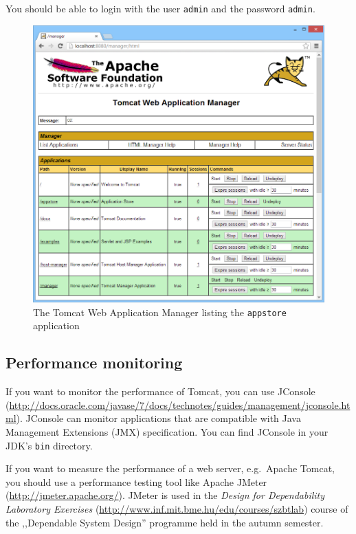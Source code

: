 \documentclass[]{report}
\let\Oldincludegraphics\includegraphics
\renewcommand{\includegraphics}[1]{
\begin{adjustbox}{max size={\textwidth}{\textheight}}
    \Oldincludegraphics[scale=0.6]{#1}%
\end{adjustbox}
}
\begin{document}
You should be able to login with the user \texttt{admin} and the
password \texttt{admin}.

\begin{figure}[htbp]
\centering
\includegraphics{img/web_services/web_application_manager.png}
\caption{The Tomcat Web Application Manager listing the
\texttt{appstore} application}
\end{figure}

\subsection{Performance monitoring}

If you want to monitor the performance of Tomcat, you can use JConsole
(\url{http://docs.oracle.com/javase/7/docs/technotes/guides/management/jconsole.html}).
JConsole can monitor applications that are compatible with Java
Management Extensions (JMX) specification. You can find JConsole in your
JDK's \texttt{bin} directory.

If you want to measure the performance of a web server, e.g.~Apache
Tomcat, you should use a performance testing tool like Apache JMeter
(\url{http://jmeter.apache.org/}). JMeter is used in the \emph{Design
for Dependability Laboratory Exercises}
(\url{http://www.inf.mit.bme.hu/edu/courses/szbtlab}) course of the
,,Dependable System Design'' programme held in the autumn semester.
\end{document}
